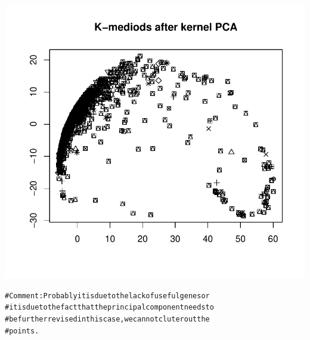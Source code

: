 \documentclass{article}\usepackage[]{graphicx}\usepackage[]{color}
\makeatletter
\def\maxwidth{ %
  \ifdim\Gin@nat@width>\linewidth
    \linewidth
  \else
    \Gin@nat@width
  \fi
}
\newenvironment{kframe}{%
 \def\at@end@of@kframe{}%
 \ifinner\ifhmode%
  \def\at@end@of@kframe{\end{minipage}}%
  \begin{minipage}{\columnwidth}%
 \fi\fi%
 \def\FrameCommand##1{\hskip\@totalleftmargin \hskip-\fboxsep
 \colorbox{shadecolor}{##1}\hskip-\fboxsep
     \hskip-\linewidth \hskip-\@totalleftmargin \hskip\columnwidth}%
 \MakeFramed {\advance\hsize-\width
   \@totalleftmargin\z@ \linewidth\hsize
   \@setminipage}}%
 {\par\unskip\endMakeFramed%
 \at@end@of@kframe}
\newenvironment{knitrout}{}{} %
\makeatother
\begin{document}
\begin{knitrout}
{\centering \includegraphics[width=\maxwidth]{figure/minimal-Problem_210} 

}


\begin{kframe}\begin{alltt}
# Comment: Probably it is due to the lack of useful genes or
# it is due to the fact that the principal component needs to
# be further revised in this case, we cannot cluter out the
# points.
\end{alltt}
\end{kframe}
\end{knitrout}
\end{document}
